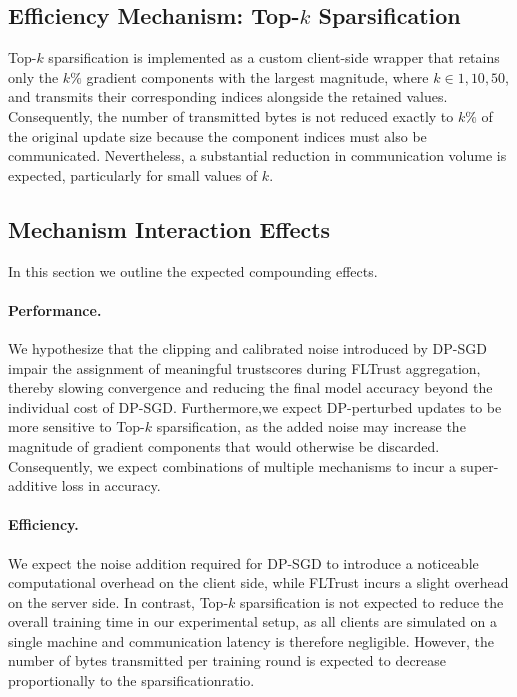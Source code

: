 \documentclass[11pt,twocolumn,a4paper,DIV=calc,parskip=half]{scrartcl}
\begin{document}
	\subsection{Efficiency Mechanism: Top-$k$ Sparsification}
	
	Top-$k$ sparsification is implemented as a custom client-side wrapper that retains only the $k\%$ gradient components with the largest magnitude, where $k \in {1,10,50}$, and transmits their corresponding indices alongside the retained values. Consequently, the number of transmitted bytes is not reduced exactly to $k\%$ of the original update size because the component indices must also be communicated. Nevertheless, a substantial reduction in communication volume is expected, particularly for small values of $k$.

	
	
	\subsection{Mechanism Interaction Effects}
	\label{sec:interaction}
	In this section we outline the expected compounding effects.
	
	\paragraph{Performance.}
	We hypothesize that the clipping and calibrated noise introduced by \ac{DP-SGD} impair the assignment of meaningful \glspl{trustscore} during FLTrust aggregation, thereby slowing convergence and reducing the final model accuracy beyond the individual cost of \ac{DP-SGD}. Furthermore,we expect  \ac{DP}-perturbed updates to be more sensitive to Top-$k$ sparsification, as the added noise may increase the magnitude of gradient components that would otherwise be discarded. Consequently, we expect combinations of multiple mechanisms to incur a super-additive loss in accuracy.
	
	\paragraph{Efficiency.}
	We expect the noise addition required for \ac{DP-SGD} to introduce a noticeable computational overhead on the client side, while FLTrust incurs a slight overhead on the server side. In contrast, Top-$k$ sparsification is not expected to reduce the overall training time in our experimental setup, as all clients are simulated on a single machine and communication latency is therefore negligible. However, the number of bytes transmitted per training round is expected to decrease proportionally to the \gls{sparsificationratio}.
\end{document}

